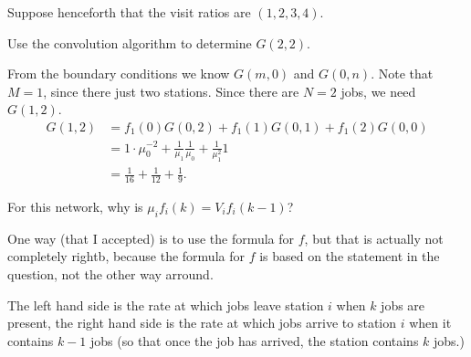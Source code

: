 Suppose henceforth that the visit ratios are $(1,2,3,4)$. 

\begin{exercise}[201706]{2}
  Use the convolution algorithm to determine $G(2,2)$.
\begin{solution}
    From the boundary conditions we know $G(m, 0)$ and $G(0,n)$. Note
    that $M=1$, since there just two stations. Since there are $N=2$
    jobs, we need $G(1,2)$. 
    \begin{equation*}
      \begin{split}
      G(1,2) &= f_1(0) G(0, 2) + f_1(1) G(0, 1) + f_1(2) G(0,0) \\
       &= 1\cdot \mu_0^{-2}  + \frac1{\mu_1} \frac{1}{\mu_0}  + \frac{1}{\mu_1^2} 1 \\
       &= \frac 1{16} + \frac1{12}  + \frac{1}{9}.
      \end{split}
    \end{equation*}
\end{solution}
\end{exercise}

\begin{exercise}[201706]
For this network, why is $\mu_i f_i(k) = V_i f_i(k-1)$? 
\begin{solution}
  One way (that I accepted)  is to use the formula for $f$, but that is actually not completely rightb, because the formula for $f$ is based on the statement in the question, not the other way arround. 

The left hand side is the rate at which jobs leave station $i$ when $k$ jobs are present, the right hand side is the rate at which jobs arrive to station $i$ when it contains $k-1$ jobs (so that once the job has arrived, the station contains $k$ jobs.)
\end{solution}
\end{exercise}




